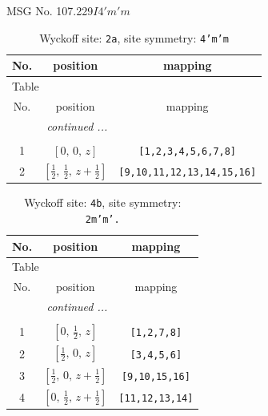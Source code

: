\documentclass[fleqn,8pt]{jsarticle}
\begin{document}
\setcounter{MaxMatrixCols}{32}

\renewcommand{\tablename}{Table~}
\renewcommand{\figurename}{Figure~}
\begin{center}
\LARGE
MSG No. 107.229\quad$I4'm'm$
\end{center}
\renewcommand{\arraystretch}{1.2}
\begin{longtable}{ccc}
\caption{Wyckoff site: {\tt 2a}, site symmetry: {\tt 4'm'm}}
 \\
 \hline \hline
No. & position & mapping \\ \hline \endfirsthead

\multicolumn{2}{l}{\tablename\ \thetable{}} \\
 \hline \hline
No. & position & mapping \\ \hline \endhead

 \hline \hline
\multicolumn{2}{r}{\footnotesize\it continued ...} \\ \endfoot

 \hline \hline
\multicolumn{2}{r}{} \\ \endlastfoot

1 & $\left[ 0,\, 0,\, z \right]$ & {\tt [1,2,3,4,5,6,7,8]} \\ \hline
2 & $\left[ \frac{1}{2},\, \frac{1}{2},\, z + \frac{1}{2} \right]$ & {\tt [9,10,11,12,13,14,15,16]} \\
\end{longtable}
\renewcommand{\arraystretch}{1.2}
\begin{longtable}{ccc}
\caption{Wyckoff site: {\tt 4b}, site symmetry: {\tt 2m'm'.}}
 \\
 \hline \hline
No. & position & mapping \\ \hline \endfirsthead

\multicolumn{2}{l}{\tablename\ \thetable{}} \\
 \hline \hline
No. & position & mapping \\ \hline \endhead

 \hline \hline
\multicolumn{2}{r}{\footnotesize\it continued ...} \\ \endfoot

 \hline \hline
\multicolumn{2}{r}{} \\ \endlastfoot

1 & $\left[ 0,\, \frac{1}{2},\, z \right]$ & {\tt [1,2,7,8]} \\ \hline
2 & $\left[ \frac{1}{2},\, 0,\, z \right]$ & {\tt [3,4,5,6]} \\ \hline
3 & $\left[ \frac{1}{2},\, 0,\, z + \frac{1}{2} \right]$ & {\tt [9,10,15,16]} \\ \hline
4 & $\left[ 0,\, \frac{1}{2},\, z + \frac{1}{2} \right]$ & {\tt [11,12,13,14]} \\
\end{longtable}
\end{document}
